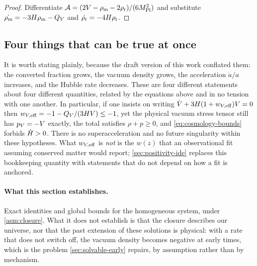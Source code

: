 \begin{proof}
  Differentiate $\mathcal A=(2V-\rho_{\mathrm{m}}-2\rho_{\mathrm{r}})/(6M_{\mathrm{Pl}}^2)$ and substitute
  $\dot{\rho_{\mathrm{m}}}=-3H\rho_{\mathrm{m}}-Q_{V}$ and $\dot{\rho_{\mathrm{r}}}=-4H\rho_{\mathrm{r}}$.
\end{proof}

\subsection{Four things that can be true at once}\label{sec:cosmology-four}

It is worth stating plainly, because the draft version of this work conflated
them: the converted fraction grows, the vacuum density grows, the acceleration
$\ddot a/a$ increases, and the Hubble rate decreases. These are four different
statements about four different quantities, related by the equations above and
in no tension with one another. In particular, if one insists on writing
$\dot{V}+3H(1+w_{V,\rm eff})V=0$ then
$w_{V,\rm eff}=-1-Q_{V}/(3H V)\le-1$, yet the physical vacuum stress
tensor still has $p_V=-V$ exactly, the total satisfies $\rho+p\ge0$, and
\cref{eq:cosmology-bounds} forbids $\dot {H}>0$. There is no
superacceleration and no future singularity within these hypotheses. What
$w_{V,\rm eff}$ is \emph{not} is the $w(z)$ that an observational fit assuming
conserved matter would report; \cref{sec:positivity-ide} replaces this
bookkeeping quantity with statements that do not depend on how a fit is
anchored.

\paragraph{What this section establishes.}
Exact identities and global bounds for the homogeneous system, under
\cref{asm:closure}. What it does not establish is that the closure describes
our universe, nor that the past extension of these solutions is physical: with
a rate that does not switch off, the vacuum density becomes negative at early
times, which is the problem \cref{sec:solvable-early}
repairs, by assumption rather than by mechanism.

